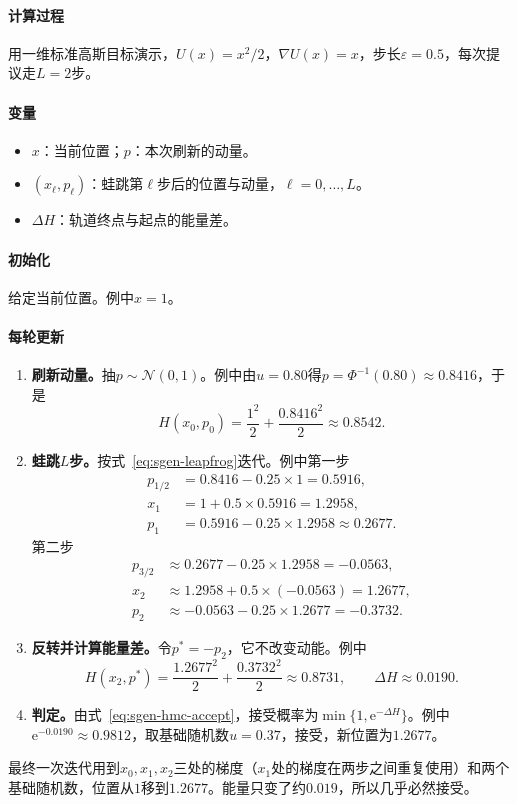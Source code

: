 \paragraph{计算过程}
用一维标准高斯目标演示，$U(x)=x^{2}/2$，$\nabla U(x)=x$，步长$\varepsilon=0.5$，每次提议走$L=2$步。

\paragraph{变量}
\begin{itemize}
  \item $x$：当前位置；$p$：本次刷新的动量。
  \item $(x_{\ell},p_{\ell})$：蛙跳第$\ell$步后的位置与动量，$\ell=0,\dots,L$。
  \item $\Delta H$：轨道终点与起点的能量差。
\end{itemize}

\paragraph{初始化}
给定当前位置。例中$x=1$。

\paragraph{每轮更新}
\begin{enumerate}
  \item \textbf{刷新动量。}抽$p\sim\mathcal{N}(0,1)$。例中由$u=0.80$得$p=\Phi^{-1}(0.80)\approx0.8416$，于是
  \[
    H(x_0,p_0)=\frac{1^{2}}{2}+\frac{0.8416^{2}}{2}\approx0.8542 .
  \]

  \item \textbf{蛙跳$L$步。}按式~\eqref{eq:sgen-leapfrog}迭代。例中第一步
  \[
    \begin{aligned}
      p_{1/2}&=0.8416-0.25\times1=0.5916,\\
      x_1&=1+0.5\times0.5916=1.2958,\\
      p_1&=0.5916-0.25\times1.2958\approx0.2677 .
    \end{aligned}
  \]
  第二步
  \[
    \begin{aligned}
      p_{3/2}&\approx0.2677-0.25\times1.2958=-0.0563,\\
      x_2&\approx1.2958+0.5\times(-0.0563)=1.2677,\\
      p_2&\approx-0.0563-0.25\times1.2677=-0.3732 .
    \end{aligned}
  \]

  \item \textbf{反转并计算能量差。}令$p^{*}=-p_2$，它不改变动能。例中
  \[
    H(x_2,p^{*})=\frac{1.2677^{2}}{2}+\frac{0.3732^{2}}{2}\approx0.8731,\qquad \Delta H\approx0.0190 .
  \]

  \item \textbf{判定。}由式~\eqref{eq:sgen-hmc-accept}，接受概率为$\min\{1,\mathrm{e}^{-\Delta H}\}$。例中$\mathrm{e}^{-0.0190}\approx0.9812$，取基础随机数$u=0.37$，接受，新位置为$1.2677$。
\end{enumerate}
最终一次迭代用到$x_0,x_1,x_2$三处的梯度（$x_1$处的梯度在两步之间重复使用）和两个基础随机数，位置从$1$移到$1.2677$。能量只变了约$0.019$，所以几乎必然接受。

